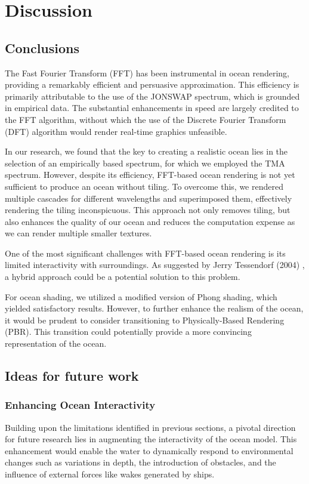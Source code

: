 \justifying
\chapter{Discussion}
\label{chapter4}

\section{Conclusions}

The Fast Fourier Transform (FFT) has been instrumental in ocean rendering, providing a remarkably efficient and persuasive approximation. This efficiency is primarily attributable to the use of the JONSWAP spectrum, which is grounded in empirical data. The substantial enhancements in speed are largely credited to the FFT algorithm, without which the use of the Discrete Fourier Transform (DFT) algorithm would render real-time graphics unfeasible.

In our research, we found that the key to creating a realistic ocean lies in the selection of an empirically based spectrum, for which we employed the TMA spectrum. However, despite its efficiency, FFT-based ocean rendering is not yet sufficient to produce an ocean without tiling. To overcome this, we rendered multiple cascades for different wavelengths and superimposed them, effectively rendering the tiling inconspicuous. This approach not only removes tiling, but also enhances the quality of our ocean and reduces the computation expense as we can render multiple smaller textures.

One of the most significant challenges with FFT-based ocean rendering is its limited interactivity with surroundings. As suggested by Jerry Tessendorf (2004) \cite{tessendorf2004}, a hybrid approach could be a potential solution to this problem.

For ocean shading, we utilized a modified version of Phong shading, which yielded satisfactory results. However, to further enhance the realism of the ocean, it would be prudent to consider transitioning to Physically-Based Rendering (PBR). This transition could potentially provide a more convincing representation of the ocean.


\section{Ideas for future work}
\subsection{Enhancing Ocean Interactivity} 
Building upon the limitations identified in previous sections, a pivotal direction for future research lies in augmenting the interactivity of the ocean model. This enhancement would enable the water to dynamically respond to environmental changes such as variations in depth, the introduction of obstacles, and the influence of external forces like wakes generated by ships. 


